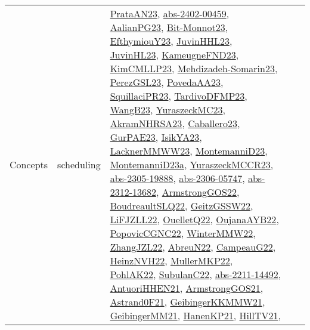 {\begin{longtable}{llp{6cm}p{6cm}p{6cm}}
Concepts & scheduling & \href{articles/PrataAN23.pdf}{PrataAN23}\cite{PrataAN23}, \href{articles/abs-2402-00459.pdf}{abs-2402-00459}\cite{abs-2402-00459}, \href{papers/AalianPG23.pdf}{AalianPG23}\cite{AalianPG23}, \href{papers/Bit-Monnot23.pdf}{Bit-Monnot23}\cite{Bit-Monnot23}, \href{papers/EfthymiouY23.pdf}{EfthymiouY23}\cite{EfthymiouY23}, \href{papers/JuvinHHL23.pdf}{JuvinHHL23}\cite{JuvinHHL23}, \href{papers/JuvinHL23.pdf}{JuvinHL23}\cite{JuvinHL23}, \href{papers/KameugneFND23.pdf}{KameugneFND23}\cite{KameugneFND23}, \href{papers/KimCMLLP23.pdf}{KimCMLLP23}\cite{KimCMLLP23}, \href{papers/Mehdizadeh-Somarin23.pdf}{Mehdizadeh-Somarin23}\cite{Mehdizadeh-Somarin23}, \href{papers/PerezGSL23.pdf}{PerezGSL23}\cite{PerezGSL23}, \href{papers/PovedaAA23.pdf}{PovedaAA23}\cite{PovedaAA23}, \href{papers/SquillaciPR23.pdf}{SquillaciPR23}\cite{SquillaciPR23}, \href{papers/TardivoDFMP23.pdf}{TardivoDFMP23}\cite{TardivoDFMP23}, \href{papers/WangB23.pdf}{WangB23}\cite{WangB23}, \href{papers/YuraszeckMC23.pdf}{YuraszeckMC23}\cite{YuraszeckMC23}, \href{articles/AkramNHRSA23.pdf}{AkramNHRSA23}\cite{AkramNHRSA23}, \href{articles/Caballero23.pdf}{Caballero23}\cite{Caballero23}, \href{articles/GurPAE23.pdf}{GurPAE23}\cite{GurPAE23}, \href{articles/IsikYA23.pdf}{IsikYA23}\cite{IsikYA23}, \href{articles/LacknerMMWW23.pdf}{LacknerMMWW23}\cite{LacknerMMWW23}, \href{articles/MontemanniD23.pdf}{MontemanniD23}\cite{MontemanniD23}, \href{articles/MontemanniD23a.pdf}{MontemanniD23a}\cite{MontemanniD23a}, \href{articles/YuraszeckMCCR23.pdf}{YuraszeckMCCR23}\cite{YuraszeckMCCR23}, \href{articles/abs-2305-19888.pdf}{abs-2305-19888}\cite{abs-2305-19888}, \href{articles/abs-2306-05747.pdf}{abs-2306-05747}\cite{abs-2306-05747}, \href{articles/abs-2312-13682.pdf}{abs-2312-13682}\cite{abs-2312-13682}, \href{papers/ArmstrongGOS22.pdf}{ArmstrongGOS22}\cite{ArmstrongGOS22}, \href{papers/BoudreaultSLQ22.pdf}{BoudreaultSLQ22}\cite{BoudreaultSLQ22}, \href{papers/GeitzGSSW22.pdf}{GeitzGSSW22}\cite{GeitzGSSW22}, \href{papers/LiFJZLL22.pdf}{LiFJZLL22}\cite{LiFJZLL22}, \href{papers/OuelletQ22.pdf}{OuelletQ22}\cite{OuelletQ22}, \href{papers/OujanaAYB22.pdf}{OujanaAYB22}\cite{OujanaAYB22}, \href{papers/PopovicCGNC22.pdf}{PopovicCGNC22}\cite{PopovicCGNC22}, \href{papers/WinterMMW22.pdf}{WinterMMW22}\cite{WinterMMW22}, \href{papers/ZhangJZL22.pdf}{ZhangJZL22}\cite{ZhangJZL22}, \href{articles/AbreuN22.pdf}{AbreuN22}\cite{AbreuN22}, \href{articles/CampeauG22.pdf}{CampeauG22}\cite{CampeauG22}, \href{articles/HeinzNVH22.pdf}{HeinzNVH22}\cite{HeinzNVH22}, \href{articles/MullerMKP22.pdf}{MullerMKP22}\cite{MullerMKP22}, \href{articles/PohlAK22.pdf}{PohlAK22}\cite{PohlAK22}, \href{articles/SubulanC22.pdf}{SubulanC22}\cite{SubulanC22}, \href{articles/abs-2211-14492.pdf}{abs-2211-14492}\cite{abs-2211-14492}, \href{papers/AntuoriHHEN21.pdf}{AntuoriHHEN21}\cite{AntuoriHHEN21}, \href{papers/ArmstrongGOS21.pdf}{ArmstrongGOS21}\cite{ArmstrongGOS21}, \href{papers/Astrand0F21.pdf}{Astrand0F21}\cite{Astrand0F21}, \href{papers/GeibingerKKMMW21.pdf}{GeibingerKKMMW21}\cite{GeibingerKKMMW21}, \href{papers/GeibingerMM21.pdf}{GeibingerMM21}\cite{GeibingerMM21}, \href{papers/HanenKP21.pdf}{HanenKP21}\cite{HanenKP21}, \href{papers/HillTV21.pdf}{HillTV21}\cite{HillTV21}, 
\end{longtable}}
